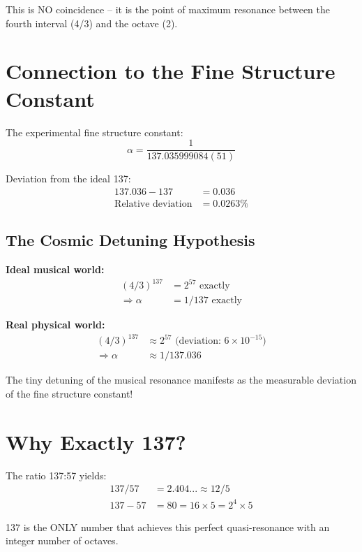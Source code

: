 \documentclass[12pt,a4paper]{article}
\begin{document}
	This is NO coincidence -- it is the point of maximum resonance between the fourth interval (4/3) and the octave (2).
	
	\section{Connection to the Fine Structure Constant}
	
	The experimental fine structure constant:
	\begin{equation}
		\alpha = \frac{1}{137.035999084(51)}
	\end{equation}
	
	Deviation from the ideal 137:
	\begin{align}
		137.036 - 137 &= 0.036\\
		\text{Relative deviation} &= 0.0263\%
	\end{align}
	
	\subsection{The Cosmic Detuning Hypothesis}
	
	\textbf{Ideal musical world:}
	\begin{align}
		(4/3)^{137} &= 2^{57} \text{ exactly}\\
		\Rightarrow \alpha &= 1/137 \text{ exactly}
	\end{align}
	
	\textbf{Real physical world:}
	\begin{align}
		(4/3)^{137} &\approx 2^{57} \text{ (deviation: } 6 \times 10^{-15}\text{)}\\
		\Rightarrow \alpha &\approx 1/137.036
	\end{align}
	
	The tiny detuning of the musical resonance manifests as the measurable deviation of the fine structure constant!
	
	\section{Why Exactly 137?}
	
	The ratio 137:57 yields:
	\begin{align}
		137/57 &= 2.404... \approx 12/5\\
		137 - 57 &= 80 = 16 \times 5 = 2^4 \times 5
	\end{align}
	
	137 is the ONLY number that achieves this perfect quasi-resonance with an integer number of octaves.
	
\end{document}
